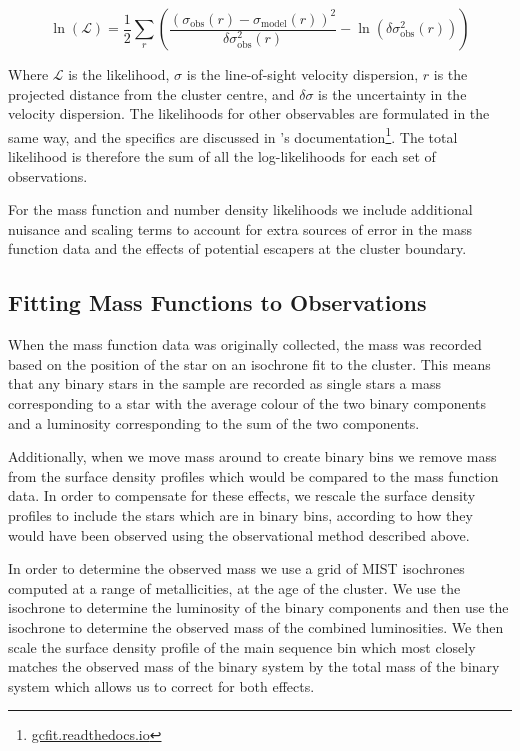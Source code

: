 \begin{equation}
	\ln \left(\mathcal{L}\right)=\frac{1}{2}
	\sum_{r}\left(\frac{\left(\sigma_{\mathrm{obs}}(r)
		-\sigma_{\mathrm{model}}(r)\right)^{2}}{\delta \sigma_{\mathrm{obs}}^{2}(r)}
	-\ln \left(\delta \sigma_{\mathrm{obs}}^{2}(r)\right)\right)
\end{equation}

Where $\mathcal{L}$ is the likelihood, $\sigma$ is the line-of-sight velocity dispersion, $r$ is the
projected distance from the cluster centre, and $\delta \sigma$ is the uncertainty in the velocity
dispersion. The likelihoods for other observables are formulated in the same way, and the specifics
are discussed in 's documentation\footnote{\url{gcfit.readthedocs.io}}. The total
likelihood is therefore the sum of all the log-likelihoods for each set of observations.

For the mass function and number density likelihoods we include additional nuisance and scaling
terms to account for extra sources of error in the mass function data and the effects of potential
escapers at the cluster boundary.




\subsection{Fitting Mass Functions to Observations}

When the mass function data was originally collected, the mass was recorded based on the position of
the star on an isochrone fit to the cluster. This means that any binary stars in the sample are
recorded as single stars a mass corresponding to a star with the average colour of the two binary
components and a luminosity corresponding to the sum of the two components.

Additionally, when we move mass around to create binary bins we remove mass from the surface density
profiles which would be compared to the mass function data. In order to compensate for these
effects, we rescale the surface density profiles to include the stars which are in binary bins,
according to how they would have been observed using the observational method described above.

In order to determine the observed mass we use a grid of MIST isochrones computed at a range of
metallicities, at the age of the cluster. We use the isochrone to determine the luminosity of the
binary components and then use the isochrone to determine the observed mass of the combined
luminosities. We then scale the surface density profile of the main sequence bin which most closely
matches the observed mass of the binary system by the total mass of the binary system which allows
us to correct for both effects.